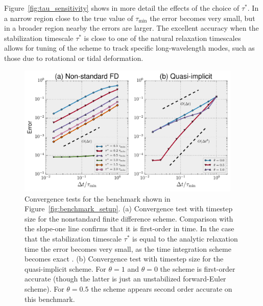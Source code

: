 \documentclass[preprint,12pt,authoryear]{elsarticle}
\begin{document}
Figure~\ref{fig:tau_sensitivity} shows in more detail the effects of the choice of $\tau^*$. In a narrow region 
close to the true value of $\tau_\mathrm{min}$ the error becomes very small, but in a broader region nearby 
the errors are larger. 
The excellent accuracy when the stabilization timescale $\tau^*$ is close to one of the natural relaxation
timescales allows for tuning of the scheme to track specific long-wavelength modes, such as 
those due to rotational or tidal deformation.

\begin{figure}
\includegraphics[width=0.95\textwidth]{figures/timestep_convergence.pdf}
\caption{Convergence tests for the benchmark shown in Figure~\ref{fig:benchmark_setup}. (a) Convergence test with timestep size for the nonstandard finite difference scheme. Comparison with the slope-one line confirms that it is first-order in time. In the case that the stabilization timescale $\tau^*$ is equal to the analytic relaxation time the error becomes very small, as the time integration scheme becomes exact \citep{mickens2002nonstandard}. (b) Convergence test with timestep size for the quasi-implicit scheme. For $\theta = 1$ and $\theta = 0$ the scheme is first-order accurate (though the latter is just an unstabilized forward-Euler scheme). For $\theta=0.5$ the scheme appears second order accurate on this benchmark.}
\label{fig:timestep_convergence}
\end{figure}
\end{document}
